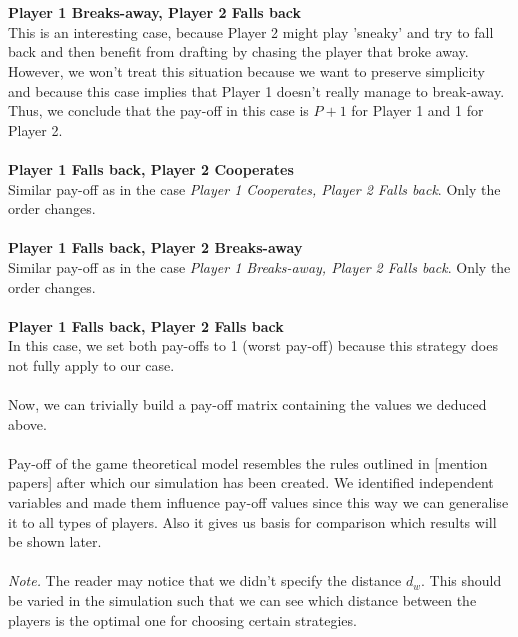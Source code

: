 \documentclass[10pt, a4paper]{report}
\begin{document}
\\\\
\textbf{Player 1 Breaks-away, Player 2 Falls back}
\\
This is an interesting case, because Player 2 might play 'sneaky' and try to fall back and then benefit from drafting by chasing the player that broke away. However, we won't treat this situation because we want to preserve simplicity and because this case implies that Player 1 doesn't really manage to break-away. Thus, we conclude that the pay-off in this case is $P+1$ for Player 1 and 1 for Player 2.
\\\\
\textbf{Player 1 Falls back, Player 2 Cooperates}
\\
Similar pay-off as in the case \textit{Player 1 Cooperates, Player 2 Falls back}. Only the order changes.
\\\\
\textbf{Player 1 Falls back, Player 2 Breaks-away}
\\
Similar pay-off as in the case \textit{Player 1 Breaks-away, Player 2 Falls back}. Only the order changes.
\\\\
\textbf{Player 1 Falls back, Player 2 Falls back}
\\
In this case, we set both pay-offs to 1 (worst pay-off) because this strategy does not fully apply to our case.
\\\\
Now, we can trivially build a pay-off matrix containing the values we deduced above.\\\\
Pay-off of the game theoretical model resembles the rules outlined in [mention papers] after which our simulation has been created. We identified independent variables and made them influence pay-off values since this way we can generalise it to all types of players. Also it gives us basis for comparison which results will be shown later.\\\\
\textit{Note.} The reader may notice that we didn't specify the distance $d_w$. This should be varied in the simulation such that we can see which distance between the players is the optimal one for choosing certain strategies.
\end{document}
